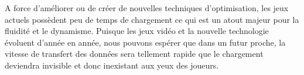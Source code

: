 \documentclass[a4paper, 12pt]{article} %
\begin{document}
A force d'améliorer ou de créer de nouvelles techniques d'optimisation, les jeux actuels possèdent peu de temps de chargement ce qui est un atout majeur pour la fluidité et le dynamisme. Puisque les jeux vidéo et la nouvelle technologie évoluent d'année en année, nous pouvons espérer que dans un futur proche, la vitesse de transfert des données sera tellement rapide que le chargement deviendra invisible et donc inexistant aux yeux des joueurs.

\newpage



\end{document}
